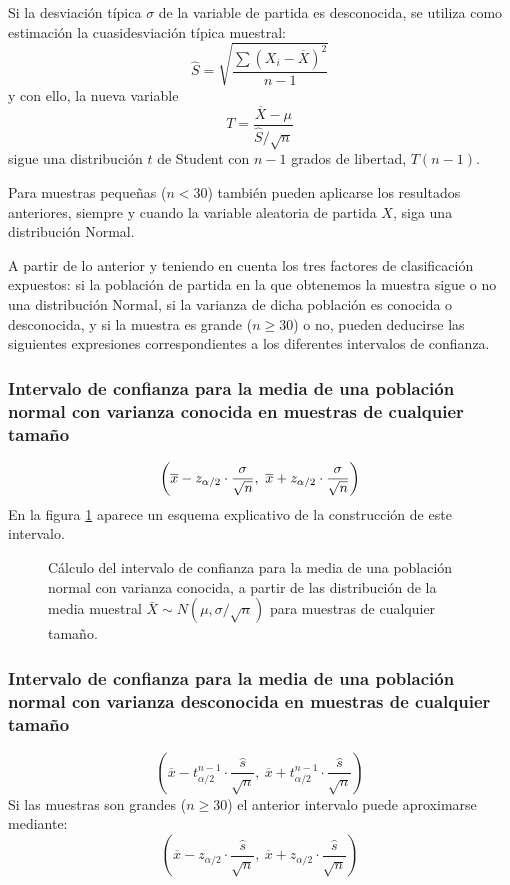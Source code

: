 Si la desviación típica $\sigma$ de la variable de partida es desconocida, se utiliza como estimación la cuasidesviación
típica muestral: \[ \hat S=\sqrt{\dfrac{\sum \left( X_{i}-\overline{X}\right) ^{2}}{n-1}} \] y con ello, la nueva
variable \[
T=\dfrac{\overline{X}-\mu }{\hat S/\sqrt{n}}
\] sigue una distribución $t$ de Student con $n-1$ grados de libertad, $T(n-1)$.

Para muestras pequeñas ($n<30$) también pueden aplicarse los resultados anteriores, siempre y cuando la variable
aleatoria de partida $X$, siga una distribución Normal.

A partir de lo anterior y teniendo en cuenta los tres factores de clasificación expuestos: si la población de partida en
la que obtenemos la muestra sigue o no una distribución Normal, si la varianza de dicha población es conocida o
desconocida, y si la muestra es grande ($n\geq30$) o no, pueden deducirse las siguientes expresiones correspondientes a
los diferentes intervalos de confianza.

\subsubsection{Intervalo de confianza para la media de una población normal con varianza conocida en muestras de
cualquier tamaño}
\[
\left( \overline{x}-z_{\alpha /2}\cdot \dfrac{\sigma }{\sqrt{n}},\ \overline{%
x}+z_{\alpha /2}\cdot \dfrac{\sigma }{\sqrt{n}}\right)
\]
En la figura \ref{g:intervalomedia} aparece un esquema explicativo de la construcción de este intervalo.
\begin{figure}[h!]
\begin{center}
\scalebox{0.8}{}
\caption{Cálculo del intervalo de confianza para la media de una población
normal con varianza conocida, a partir de las distribución de la media muestral $\bar X\sim N(\mu,\sigma/\sqrt n)$ para muestras de cualquier tamaño.} \label{g:intervalomedia}
\end{center}
\end{figure}


\subsubsection{Intervalo de confianza para la media de una población normal con varianza desconocida en muestras de
cualquier tamaño} 
\[ \left( \overline{x}-t_{\alpha /2}^{n-1}\cdot \dfrac{\hat s}{\sqrt{n}},\ \overline{x}+t_{\alpha
/2}^{n-1}\cdot \dfrac{\hat s}{\sqrt{n}}\right) 
\]
Si las muestras son grandes ($n\geq30$) el anterior intervalo puede aproximarse mediante:
\[
\left( \overline{x}-z_{\alpha /2}\cdot \dfrac{\hat s}{\sqrt{n}},\  \overline{x}+z_{\alpha /2}\cdot
\dfrac{\hat s}{\sqrt{n}}\right)
\]


